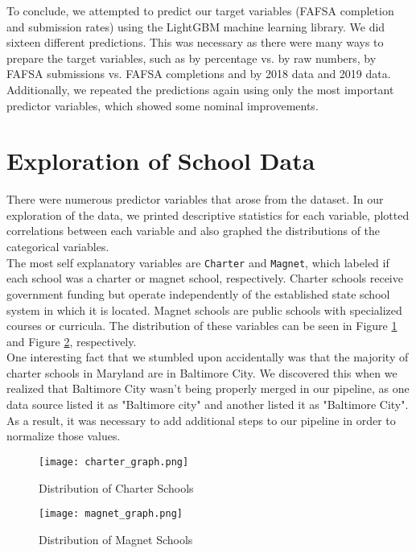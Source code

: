 \documentclass[12pt]{article}
\begin{document}
To conclude, we attempted to predict our target variables (FAFSA completion and
submission rates) using the LightGBM machine learning library.\cite{lightgbm2019}
We did sixteen different predictions. This was necessary as there were many ways
to prepare the target variables, such as by percentage vs. by raw numbers, by FAFSA
submissions vs. FAFSA completions and by 2018 data and 2019 data. Additionally,
we repeated the predictions again using only the most important predictor variables,
which showed some nominal improvements.

\section{Exploration of School Data}
There were numerous predictor variables that arose from the dataset. In our
exploration of the data, we printed descriptive statistics for each variable,
plotted correlations between each variable and also graphed the distributions 
of the categorical variables. \\

The most self explanatory variables are \texttt{Charter} and \texttt{Magnet}, 
which labeled if each school was a charter or magnet school, respectively. 
Charter schools receive government funding but operate independently of 
the established state school system in which it is located. Magnet schools 
are public schools with specialized courses or curricula. The distribution of
these variables can be seen in Figure \ref{fig:charter} and Figure \ref{fig:magnet}, 
respectively. \\

One interesting fact that we stumbled upon accidentally was 
that the majority of charter schools in Maryland are in Baltimore City. 
We discovered this when we realized that Baltimore City wasn't being properly 
merged in our pipeline, as one data source listed it as "Baltimore city" and another
listed it as "Baltimore City". As a result, it was necessary to add additional 
steps to our pipeline in order to normalize those values. \\

\begin{figure}[!htb]
  \centering
  \texttt{[image: charter\_graph.png]}
  \caption{Distribution of Charter Schools}
  \label{fig:charter}
\end{figure}

\begin{figure}[!htb]
  \centering
  \texttt{[image: magnet\_graph.png]}
  \caption{Distribution of Magnet Schools}
  \label{fig:magnet}
\end{figure}
\end{document}
